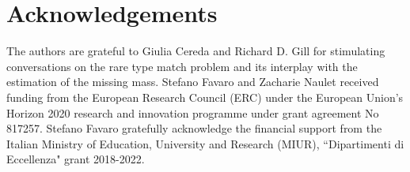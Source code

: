 \documentclass{article}
\newcommand{\1}{\boldsymbol{1}}
\theoremstyle{plain}
\begin{document}

\section*{Acknowledgements}

The authors are grateful to Giulia Cereda and Richard D. Gill for stimulating conversations on the rare type match problem and its interplay with the estimation of the missing mass. Stefano Favaro and Zacharie Naulet received funding from the European Research Council (ERC) under the European Union's Horizon 2020 research and innovation programme under grant agreement No 817257. Stefano Favaro gratefully acknowledge the financial support from the Italian Ministry of Education, University and Research (MIUR), ``Dipartimenti di Eccellenza" grant 2018-2022.


\end{document}
